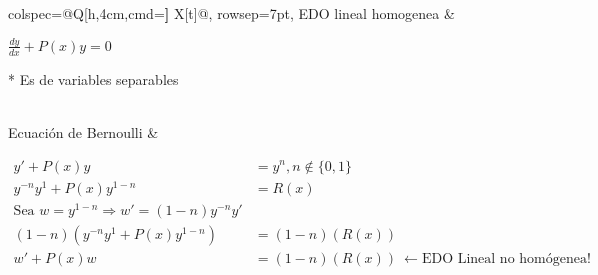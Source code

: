 \documentclass[letterpaper]{article}
\def \T{Programación de Modelos en\\Ecuaciones Diferenciales}
\def \S{Bernoulli}
\begin{document}
\vspace{16pt}


\begin{longtblr}{
    colspec={@{}Q[h,4cm,cmd=\textbf] X[t]@{}},
    rowsep={7pt},
  }
  EDO lineal homogenea
  & {
    $\frac{dy}{dx} + P(x) y = 0$

    * Es de variables separables
  }
  \\
  Ecuación de Bernoulli
  & \begin{minipage}{\linewidth}
    \begin{align*}
      y' + P(x) y &= y^{n}, n \notin \{0,1\} \\
      y^{-n} y^{1} + P(x) y^{1-n} &= R(x) \\
      \text{Sea } w = y^{1-n} \Rightarrow w' = (1-n) y^{-n} y' \\
      (1-n) (y^{-n} y^{1} + P(x) y^{1-n}) &= (1-n) (R(x)) \\
      w' + P(x) w &= (1-n) (R(x)) ~\leftarrow\text{EDO Lineal no homógenea!}\\
    \end{align*}
  \end{minipage}


\end{longtblr}
\end{document}
